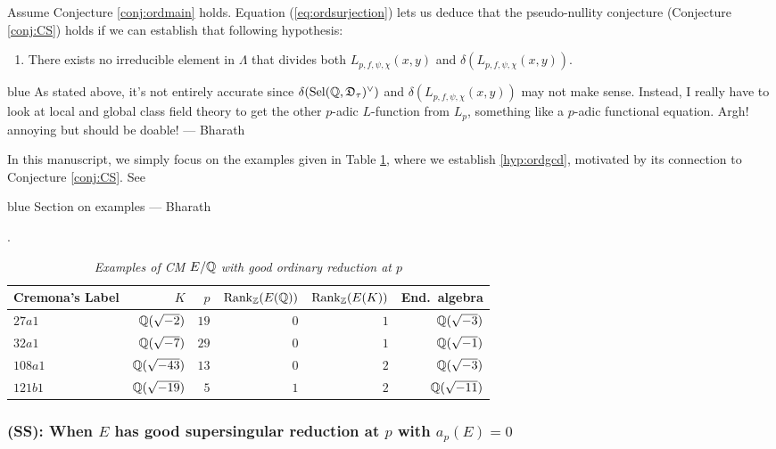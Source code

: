 \documentclass[a4paper,11pt]{article}
\newcommand{\BP}[1]{
	\begin{color}{blue}
		\marginpar{$\heartsuit$} #1
		--- Bharath
	\end{color}
}
\numberwithin{equation}{section}
\newcommand{\Sel}{\mathrm{Sel}}
\newcommand{\DDD}{\mathfrak{D}}
\begin{document}
Assume Conjecture \ref{conj:ordmain} holds. Equation (\ref{eq:ordsurjection}) lets us deduce that the pseudo-nullity conjecture (Conjecture \ref{conj:CS}) holds if we can establish that following hypothesis:
\begin{enumerate}[style=sameline, style=sameline, align=left,label=(\textsc{ord:gcd}) --- , ref=(\textsc{ord:gcd})]
\item\label{hyp:ssgcd} There exists no irreducible element in $\Lambda$ that divides both $L_{p,f,\psi,\chi}(x,y)$ and $\delta(L_{p,f,\psi,\chi}(x,y))$.
\end{enumerate}

\BP{As stated above, it's not entirely accurate since $\delta(\Sel(\Q,\DDD_\tau)^\vee)$ and $\delta(L_{p,f,\psi,\chi}(x,y))$ may not make sense. Instead, I really have to look at local and global class field theory to get the other $p$-adic $L$-function from $L_p$, something like a $p$-adic functional equation. Argh! annoying but should be doable!}

In this manuscript, we simply focus on the examples given in Table \ref{table:ordinary}, where we establish  \ref{hyp:ordgcd}, motivated by its connection to Conjecture \ref{conj:CS}. See \BP{Section on examples}.

\begin{table}[H]	\caption{\label{table:ordinary}\emph{Examples of CM $E/\mathbb{Q}$ with good ordinary reduction at $p$}}
\begin{tabular}[t]{lrrrrr}
	\toprule
 Cremona's Label          &  $K$    &  $p$    & $\mathrm{Rank}_{\mathbb{Z}}(E(\mathbb{Q}))$   & $\mathrm{Rank}_{\mathbb{Z}}(E(K))$ &   End.~algebra    \\ \midrule

$27a1$   &   $\mathbb{Q}(\sqrt{-2})$  &  $19$ &  $0$   &    $1$  & $\mathbb{Q}(\sqrt{-3})$   \\\addlinespace
$32a1$ &   $\mathbb{Q}(\sqrt{-7})$  & $29$    &  $0$   & $1$    & $\mathbb{Q}(\sqrt{-1})$   \\\addlinespace
$108a1$ &   $\mathbb{Q}(\sqrt{-43})$  & $13$    &  $0$   & $2$    & $\mathbb{Q}(\sqrt{-3})$   \\\addlinespace
$121b1$ &   $\mathbb{Q}(\sqrt{-19})$   &   $5$ &  $1$   & $2$    & $\mathbb{Q}(\sqrt{-11})$     \\
\bottomrule
\end{tabular}
\end{table}



\subsubsection*{(SS): When $E$ has good supersingular reduction at $p$ with $a_p(E)=0$}
\end{document}
